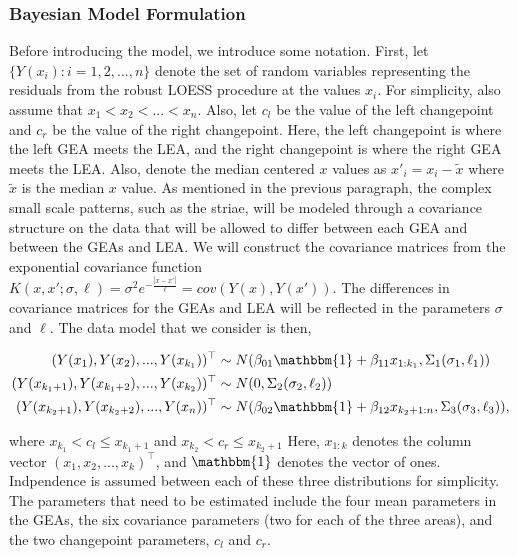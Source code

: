 \documentclass[12pt]{article}
\begin{document}
\subsubsection{Bayesian Model Formulation}

Before introducing the model, we introduce some notation. First, let
\(\{Y(x_i): i = 1,2, ..., n\}\) denote the set of random variables
representing the residuals from the robust LOESS procedure at the values
\(x_i\). For simplicity, also assume that \(x_1 < x_2 < ... < x_n\).
Also, let \(c_l\) be the value of the left changepoint and \(c_r\) be
the value of the right changepoint. Here, the left changepoint is where
the left GEA meets the LEA, and the right changepoint is where the right
GEA meets the LEA. Also, denote the median centered \(x\) values as
\(x'_i = x_i - \tilde{x}\) where \(\tilde{x}\) is the median \(x\)
value. As mentioned in the previous paragraph, the complex small scale
patterns, such as the striae, will be modeled through a covariance
structure on the data that will be allowed to differ between each GEA
and between the GEAs and LEA. We will construct the covariance matrices
from the exponential covariance function
\(K(x, x';\sigma, \ell) = \sigma^2 e^{-\frac{|x - x'|}{\ell}} = cov(Y(x), Y(x'))\).
The differences in covariance matrices for the GEAs and LEA will be
reflected in the parameters \(\sigma\) and \(\ell\). The data model that
we consider is then,

\begin{align}
(Y(x_1), Y(x_2), ..., Y(x_{k_1}))^{\top} &\sim N(\beta_{01}\mathbbm{1} + \beta_{11} x_{1:k_1}, \Sigma_1(\sigma_1, \ell_1)) \\
(Y(x_{k_1 + 1}), Y(x_{k_1 + 2}), ..., Y(x_{k_2}))^{\top} &\sim N(0, \Sigma_2(\sigma_2, \ell_2)) \\ 
(Y(x_{k_2 + 1}), Y(x_{k_2 + 2}), ..., Y(x_n))^{\top} &\sim N(\beta_{02}\mathbbm{1} + \beta_{12} x_{k_2 + 1:n}, \Sigma_3(\sigma_3, \ell_3)),
\end{align}

\noindent where \(x_{k_1} < c_l \leq x_{k_1 + 1}\) and
\(x_{k_2} < c_r \leq x_{k_2 + 1}\) Here, \(x_{1:k}\) denotes the column
vector \((x_1, x_2, ..., x_k)^\top\), and \(\mathbbm{1}\) denotes the
vector of ones. Indpendence is assumed between each of these three
distributions for simplicity. The parameters that need to be estimated
include the four mean parameters in the GEAs, the six covariance
parameters (two for each of the three areas), and the two changepoint
parameters, \(c_l\) and \(c_r\).
\end{document}
